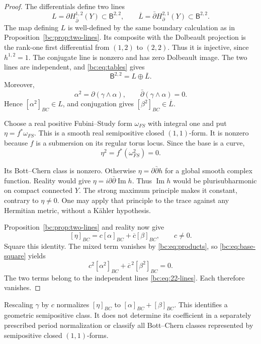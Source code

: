 \begin{proof}
The differentials define two lines
\[
 L=\partial H_{\bar\partial}^{1,2}(Y)\subset\mathsf B^{2,2},
 \qquad
 \overline L=\bar\partial H_\partial^{2,1}(Y)
                                      \subset\mathsf B^{2,2}.
\]
The map defining $L$ is well-defined by the same boundary
calculation as in Proposition~\ref{bc:prop:two-lines}.
Its composite with the Dolbeault projection is the rank-one
first differential from $(1,2)$ to $(2,2)$.
Thus it is injective, since $h^{1,2}=1$.
The conjugate line is nonzero and has zero Dolbeault image.
The two lines are independent, and \eqref{bc:eq:tables} gives
\begin{equation}\label{bc:eq:22-lines}
                    \mathsf B^{2,2}=L\oplus\overline L.
\end{equation}
Moreover,
\[
 \alpha^2=\partial(\gamma\wedge\alpha),\qquad
 \bar\partial(\gamma\wedge\alpha)=0.
\]
Hence $[\alpha^2]_{BC}\in L$, and conjugation gives
$[\beta^2]_{BC}\in\overline L$.

Choose a real positive Fubini--Study form $\omega_{FS}$ with
integral one and put $\eta=f^*\omega_{FS}$.
This is a smooth real semipositive closed $(1,1)$-form.
It is nonzero because $f$ is a submersion on its regular torus
locus. Since the base is a curve,
\begin{equation}\label{bc:eq:base-square}
                         \eta^2=f^*(\omega_{FS}^2)=0.
\end{equation}

Its Bott--Chern class is nonzero. Otherwise
$\eta=\partial\bar\partial h$ for a global smooth complex function.
Reality would give $\eta=i\partial\bar\partial\operatorname{Im}h$.
Thus $\operatorname{Im}h$ would be plurisubharmonic on compact
connected $Y$. The strong maximum principle makes it constant,
contrary to $\eta\ne0$.
One may apply that principle to the trace against any Hermitian
metric, without a K\"ahler hypothesis.

Proposition~\ref{bc:prop:two-lines} and reality now give
\[
 [\eta]_{BC}=c[\alpha]_{BC}+\overline c[\beta]_{BC},
 \qquad c\ne0.
\]
Square this identity. The mixed term vanishes by
\eqref{bc:eq:products}, so \eqref{bc:eq:base-square} yields
\[
      c^2[\alpha^2]_{BC}+\overline c^{\,2}[\beta^2]_{BC}=0.
\]
The two terms belong to the independent lines
\eqref{bc:eq:22-lines}. Each therefore vanishes.
\end{proof}

Rescaling $\gamma$ by $c$ normalizes $[\eta]_{BC}$ to
$[\alpha]_{BC}+[\beta]_{BC}$.
This identifies a geometric semipositive class.
It does not determine its coefficient in a separately prescribed
period normalization or classify all Bott--Chern classes represented
by semipositive closed $(1,1)$-forms.

